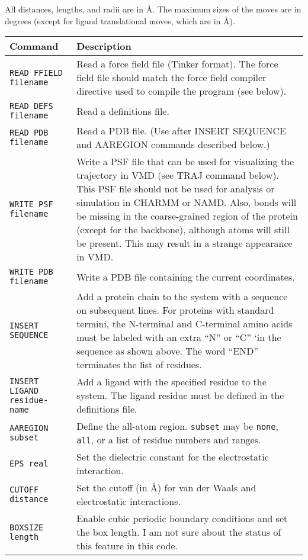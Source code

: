 \documentclass{article}      %
\begin{document}
All distances, lengths, and radii are in \AA.  The maximum sizes of the moves are in degrees (except for ligand translational moves, which are in \AA).

\begin{longtable}{|l|p{3.25in}|}
\hline
Command & Description \\
\hline
\verb+READ FFIELD filename+ & Read a force field file (Tinker format).  The force field file should match the force field compiler directive used to compile the program (see below).   \\
\hline
\verb+READ DEFS filename+ & Read a definitions file. \\
\hline
\verb+READ PDB filename+ & Read a PDB file. (Use after INSERT SEQUENCE and AAREGION commands described below.) \\
\hline
\verb+WRITE PSF filename+ & Write a PSF file that can be used for visualizing the trajectory in VMD (see TRAJ command below).  This PSF file should not be used for analysis or simulation in CHARMM or NAMD.  Also, bonds will be missing in the coarse-grained region of the  protein (except for the backbone), although atoms will still be present.  This may result in a strange appearance in VMD. \\ 
\hline
\verb+WRITE PDB filename+ & Write a PDB file containing the current coordinates. \\
\hline
\verb+INSERT SEQUENCE+ & Add a protein chain to the system with a sequence on subsequent lines.  For proteins with standard termini, the N-terminal and C-terminal amino acids must be labeled with an extra ``N'' or ``C'' `in the sequence as shown above.  The word ``END'' terminates the list of residues. \\
\hline
\verb+INSERT LIGAND residue-name+ & Add a ligand with the specified residue to the system.  The ligand residue must be defined in the definitions file.\\
\hline
\verb+AAREGION subset+ & Define the all-atom region.  \verb+subset+ may be \verb+none+, \verb+all+, or a list of residue numbers and ranges. \\
\hline
\verb+EPS real+& Set the dielectric constant for the electrostatic interaction. \\
\hline
\verb+CUTOFF distance+& Set the cutoff (in \AA) for van der Waals and electrostatic interactions. \\
\hline
\verb+BOXSIZE length+& Enable cubic periodic boundary conditions and set the box length.  I am not sure about the status of this feature in this code. \\

\end{longtable}
\end{document}
